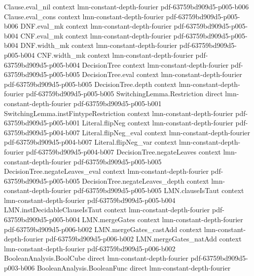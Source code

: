 \begin{lemma}
\proofstep
  {Clause.eval_nil}
  {context}
  {lmn-constant-depth-fourier}
  {pdf-63759bd909d5-p005-b006}
\proofstep
  {Clause.eval_cons}
  {context}
  {lmn-constant-depth-fourier}
  {pdf-63759bd909d5-p005-b006}
\proofstep
  {DNF.eval_mk}
  {context}
  {lmn-constant-depth-fourier}
  {pdf-63759bd909d5-p005-b004}
\proofstep
  {CNF.eval_mk}
  {context}
  {lmn-constant-depth-fourier}
  {pdf-63759bd909d5-p005-b004}
\proofstep
  {DNF.width_mk}
  {context}
  {lmn-constant-depth-fourier}
  {pdf-63759bd909d5-p005-b004}
\proofstep
  {CNF.width_mk}
  {context}
  {lmn-constant-depth-fourier}
  {pdf-63759bd909d5-p005-b004}
\proofstep
  {DecisionTree}
  {context}
  {lmn-constant-depth-fourier}
  {pdf-63759bd909d5-p005-b005}
\proofstep
  {DecisionTree.eval}
  {context}
  {lmn-constant-depth-fourier}
  {pdf-63759bd909d5-p005-b005}
\proofstep
  {DecisionTree.depth}
  {context}
  {lmn-constant-depth-fourier}
  {pdf-63759bd909d5-p005-b005}
\proofstep
  {SwitchingLemma.Restriction}
  {direct}
  {lmn-constant-depth-fourier}
  {pdf-63759bd909d5-p005-b001}
\proofstep
  {SwitchingLemma.instFintypeRestriction}
  {context}
  {lmn-constant-depth-fourier}
  {pdf-63759bd909d5-p005-b001}
\proofstep
  {Literal.flipNeg}
  {context}
  {lmn-constant-depth-fourier}
  {pdf-63759bd909d5-p004-b007}
\proofstep
  {Literal.flipNeg_eval}
  {context}
  {lmn-constant-depth-fourier}
  {pdf-63759bd909d5-p004-b007}
\proofstep
  {Literal.flipNeg_var}
  {context}
  {lmn-constant-depth-fourier}
  {pdf-63759bd909d5-p004-b007}
\proofstep
  {DecisionTree.negateLeaves}
  {context}
  {lmn-constant-depth-fourier}
  {pdf-63759bd909d5-p005-b005}
\proofstep
  {DecisionTree.negateLeaves_eval}
  {context}
  {lmn-constant-depth-fourier}
  {pdf-63759bd909d5-p005-b005}
\proofstep
  {DecisionTree.negateLeaves_depth}
  {context}
  {lmn-constant-depth-fourier}
  {pdf-63759bd909d5-p005-b005}
\proofstep
  {LMN.clauseIsTaut}
  {context}
  {lmn-constant-depth-fourier}
  {pdf-63759bd909d5-p005-b004}
\proofstep
  {LMN.instDecidableClauseIsTaut}
  {context}
  {lmn-constant-depth-fourier}
  {pdf-63759bd909d5-p005-b004}
\proofstep
  {LMN.mergeGates}
  {context}
  {lmn-constant-depth-fourier}
  {pdf-63759bd909d5-p006-b002}
\proofstep
  {LMN.mergeGates_castAdd}
  {context}
  {lmn-constant-depth-fourier}
  {pdf-63759bd909d5-p006-b002}
\proofstep
  {LMN.mergeGates_natAdd}
  {context}
  {lmn-constant-depth-fourier}
  {pdf-63759bd909d5-p006-b002}
\proofstep
  {BooleanAnalysis.BoolCube}
  {direct}
  {lmn-constant-depth-fourier}
  {pdf-63759bd909d5-p003-b006}
\proofstep
  {BooleanAnalysis.BooleanFunc}
  {direct}
  {lmn-constant-depth-fourier}

\end{lemma}
